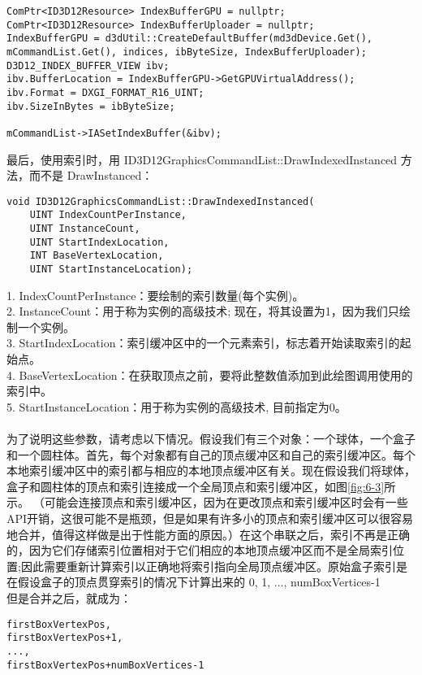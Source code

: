 \begin{flushleft}
\begin{lstlisting}
ComPtr<ID3D12Resource> IndexBufferGPU = nullptr;
ComPtr<ID3D12Resource> IndexBufferUploader = nullptr;
IndexBufferGPU = d3dUtil::CreateDefaultBuffer(md3dDevice.Get(), mCommandList.Get(), indices, ibByteSize, IndexBufferUploader);
D3D12_INDEX_BUFFER_VIEW ibv;
ibv.BufferLocation = IndexBufferGPU->GetGPUVirtualAddress();
ibv.Format = DXGI_FORMAT_R16_UINT;
ibv.SizeInBytes = ibByteSize;

mCommandList->IASetIndexBuffer(&ibv);
\end{lstlisting}
最后，使用索引时，用 ID3D12GraphicsCommandList::DrawIndexedInstanced 方法，而不是 DrawInstanced：\\
\begin{lstlisting}
void ID3D12GraphicsCommandList::DrawIndexedInstanced(
    UINT IndexCountPerInstance,
    UINT InstanceCount,
    UINT StartIndexLocation,
    INT BaseVertexLocation,
    UINT StartInstanceLocation);
\end{lstlisting}
1. IndexCountPerInstance：要绘制的索引数量(每个实例)。\\
2. InstanceCount：用于称为实例的高级技术; 现在，将其设置为1，因为我们只绘制一个实例。\\
3. StartIndexLocation：索引缓冲区中的一个元素索引，标志着开始读取索引的起始点。\\
4. BaseVertexLocation：在获取顶点之前，要将此整数值添加到此绘图调用使用的索引中。\\
5. StartInstanceLocation：用于称为实例的高级技术, 目前指定为0。\\
~\\
为了说明这些参数，请考虑以下情况。假设我们有三个对象：一个球体，一个盒子和一个圆柱体。首先，每个对象都有自己的顶点缓冲区和自己的索引缓冲区。每个本地索引缓冲区中的索引都与相应的本地顶点缓冲区有关。现在假设我们将球体，盒子和圆柱体的顶点和索引连接成一个全局顶点和索引缓冲区，如图\ref{fig:6-3}所示。 （可能会连接顶点和索引缓冲区，因为在更改顶点和索引缓冲区时会有一些API开销，这很可能不是瓶颈，但是如果有许多小的顶点和索引缓冲区可以很容易地合并，值得这样做是出于性能方面的原因。）在这个串联之后，索引不再是正确的，因为它们存储索引位置相对于它们相应的本地顶点缓冲区而不是全局索引位置;因此需要重新计算索引以正确地将索引指向全局顶点缓冲区。原始盒子索引是在假设盒子的顶点贯穿索引的情况下计算出来的 0, 1, ..., numBoxVertices-1\\
但是合并之后，就成为：\\
\begin{lstlisting}
firstBoxVertexPos,
firstBoxVertexPos+1,
...,
firstBoxVertexPos+numBoxVertices-1
\end{lstlisting}
 

\end{flushleft}
